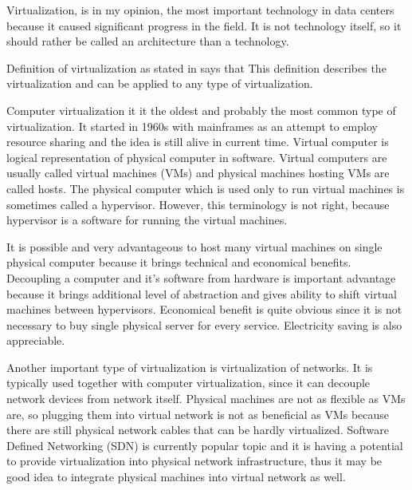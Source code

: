 
Virtualization, is in my opinion, the most important technology in data centers because it caused significant progress in the field. It is not technology itself, so it should rather be called an architecture than a technology.

Definition of virtualization as stated in \cite{virtualization-in-education} says that  This definition describes the virtualization and can be applied to any type of virtualization.

Computer virtualization it it the oldest and probably the most common type of virtualization.
It started in 1960s with mainframes as an attempt to employ resource sharing and the idea is still alive in current time. 
Virtual computer is logical representation of physical computer in software. \cite{virtualization-in-education} Virtual computers are usually called virtual machines (\Ac{VM}s) and physical machines hosting \Ac{VM}s are called hosts. 
The physical computer which is used only to run virtual machines is sometimes called a hypervisor. However, this terminology is not right, because hypervisor is a software for running the virtual machines.

It is possible and very advantageous to host many virtual machines on single physical computer because it brings technical and economical benefits. Decoupling a computer and it's software from hardware is important advantage because it brings additional level of abstraction and gives ability to shift virtual machines between hypervisors. Economical benefit is quite obvious since it is not necessary to buy single physical server for every service. Electricity saving is also appreciable.

Another important type of virtualization is virtualization of networks. It is typically used together with computer virtualization, since it can decouple network devices from network itself. Physical machines are not as flexible as \Ac{VM}s are, so plugging them into virtual network is not as beneficial as \Ac{VM}s because there are still physical network cables that can be hardly virtualized. Software Defined Networking (\Ac{SDN}) is currently popular topic and it is having a potential to provide virtualization into physical network infrastructure, thus it may be good idea to integrate physical machines into virtual network as well.

